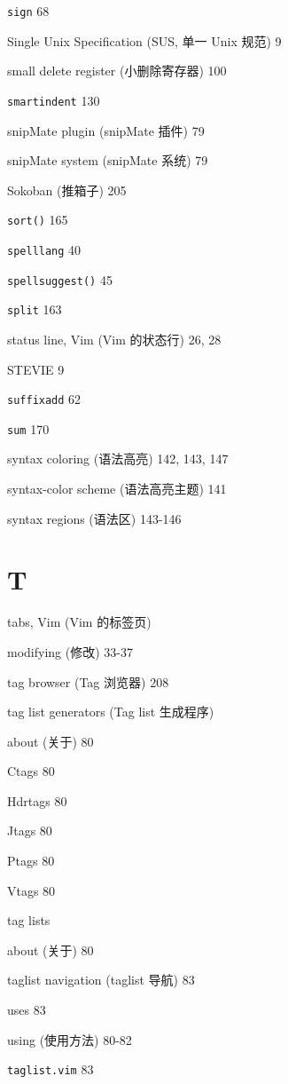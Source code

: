 \begin{multicols}{2}
\texttt{sign} 68

Single Unix Specification (SUS, 单一 Unix 规范) 9

small delete register (小删除寄存器) 100

\texttt{smartindent} 130

snipMate plugin (snipMate 插件) 79

snipMate system (snipMate 系统) 79

Sokoban (推箱子) 205

\texttt{sort()} 165

\texttt{spelllang} 40

\texttt{spellsuggest()} 45

\texttt{split} 163

status line, Vim (Vim 的状态行) 26, 28

STEVIE 9

\texttt{suffixadd} 62

\texttt{sum} 170

syntax coloring (语法高亮) 142, 143, 147

syntax-color scheme (语法高亮主题) 141

syntax regions (语法区) 143-146

\section*{T}

tabs, Vim (Vim 的标签页) \par
  modifying (修改) 33-37 \par

tag browser (Tag 浏览器) 208

tag list generators (Tag list 生成程序) \par
  about (关于) 80 \par
  Ctags 80 \par
  Hdrtags 80 \par
  Jtags 80 \par
  Ptags 80 \par
  Vtags 80 \par

tag lists \par
  about (关于) 80 \par
  taglist navigation (taglist 导航) 83 \par
  uses 83 \par
  using (使用方法) 80-82 \par

\texttt{taglist.vim} 83


\end{multicols}

